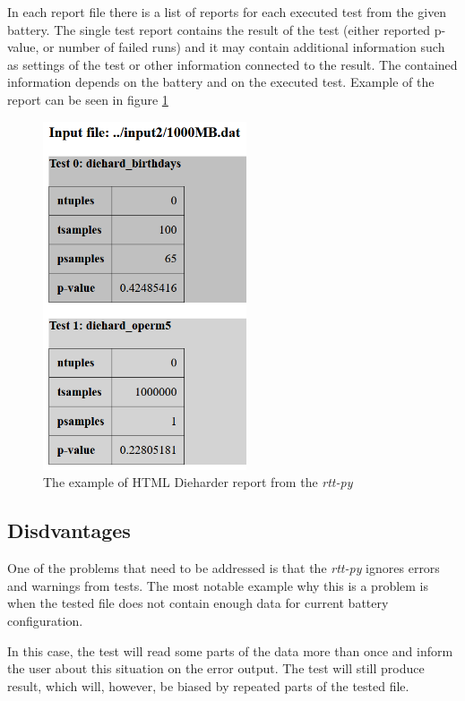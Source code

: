 \documentclass[
  digital,     %
  oneside,     %
  nosansbold,  %
  nocolorbold, %
  nolof,         %
  nolot,         %
]{fithesis4}
\begin{document}
In each report file there is a list of reports for each executed test from the given battery. The single test report contains the result of the test (either reported p-value, or number of failed runs) and it may contain additional information such as settings of the test or other information connected to the result. The contained information depends on the battery and on the executed test. Example of the  report can be seen in figure \ref{fig:rtt_py_html}
\begin{figure}
  \begin{center}
    \includegraphics[width=6cm]{figures/rtt-py-dieharder-html.png}
  \end{center}
  \caption{The example of HTML Dieharder report from the \emph{rtt-py}}
  \label{fig:rtt_py_html}
\end{figure}

\subsection{Disdvantages}
One of the problems that need to be addressed is that the \emph{rtt-py } ignores errors and warnings from tests. The most notable example why this is a problem is when the tested file does not contain enough data for current battery configuration.

In this case, the test will read some parts of the data more than once and inform the user about this situation on the error output. The test will still produce result, which will, however, be biased by repeated parts of the tested file.
\end{document}
